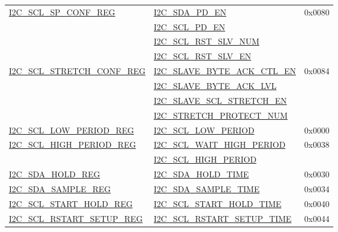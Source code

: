 \documentclass[main\_\_CN.tex]{subfiles}
\begin{document}
\begin{longtable}{ | p{6cm} | p{7cm} | p{2cm} | }
\hyperref[regdesc:I2CSCLSPCONFREG]{I2C\_SCL\_SP\_CONF\_REG} & {\hyperref[fielddesc:I2CSDAPDEN]{I2C\_SDA\_PD\_EN}} & 0x0080  \\\cline{2-2}
& {\hyperref[fielddesc:I2CSCLPDEN]{I2C\_SCL\_PD\_EN}}& \\\cline{2-2}
& {\hyperref[fielddesc:I2CSCLRSTSLVNUM]{I2C\_SCL\_RST\_SLV\_NUM}}& \\\cline{2-2}
& {\hyperref[fielddesc:I2CSCLRSTSLVEN]{I2C\_SCL\_RST\_SLV\_EN}}& \\ \hline

\hyperref[regdesc:I2CSCLSTRETCHCONFREG]{I2C\_SCL\_STRETCH\_CONF\_REG} & {\hyperref[fielddesc:I2CSLAVEBYTEACKCTLEN]{I2C\_SLAVE\_BYTE\_ACK\_CTL\_EN}} & 0x0084  \\\cline{2-2}
& {\hyperref[fielddesc:I2CSLAVEBYTEACKLVL]{I2C\_SLAVE\_BYTE\_ACK\_LVL}}& \\\cline{2-2}
& {\hyperref[fielddesc:I2CSLAVESCLSTRETCHEN]{I2C\_SLAVE\_SCL\_STRETCH\_EN}}& \\\cline{2-2}
& {\hyperref[fielddesc:I2CSTRETCHPROTECTNUM]{I2C\_STRETCH\_PROTECT\_NUM}}& \\ \hline

\hyperref[regdesc:I2CSCLLOWPERIODREG]{I2C\_SCL\_LOW\_PERIOD\_REG} & \hyperref[fielddesc:I2CSCLLOWPERIOD]{I2C\_SCL\_LOW\_PERIOD} & 0x0000  \\ \hline

\hyperref[regdesc:I2CSCLHIGHPERIODREG]{I2C\_SCL\_HIGH\_PERIOD\_REG} & \hyperref[fielddesc:I2CSCLWAITHIGHPERIOD]{I2C\_SCL\_WAIT\_HIGH\_PERIOD} & 0x0038  \\\cline{2-2}
& \hyperref[fielddesc:I2CSCLHIGHPERIOD]{I2C\_SCL\_HIGH\_PERIOD}& \\ \hline

\hyperref[regdesc:I2CSDAHOLDREG]{I2C\_SDA\_HOLD\_REG} & \hyperref[fielddesc:I2CSDAHOLDTIME]{I2C\_SDA\_HOLD\_TIME} & 0x0030  \\\hline
\hyperref[regdesc:I2CSDASAMPLEREG]{I2C\_SDA\_SAMPLE\_REG} & \hyperref[fielddesc:I2CSDASAMPLETIME]{I2C\_SDA\_SAMPLE\_TIME} & 0x0034  \\ \hline

\hyperref[regdesc:I2CSCLSTARTHOLDREG]{I2C\_SCL\_START\_HOLD\_REG} & \hyperref[fielddesc:I2CSCLSTARTHOLDTIME]{I2C\_SCL\_START\_HOLD\_TIME} & 0x0040  \\ \hline
\hyperref[regdesc:I2CSCLRSTARTSETUPREG]{I2C\_SCL\_RSTART\_SETUP\_REG} & \hyperref[fielddesc:I2CSCLRSTARTSETUPTIME]{I2C\_SCL\_RSTART\_SETUP\_TIME} & 0x0044  \\ \hline


\end{longtable}
\end{document}
